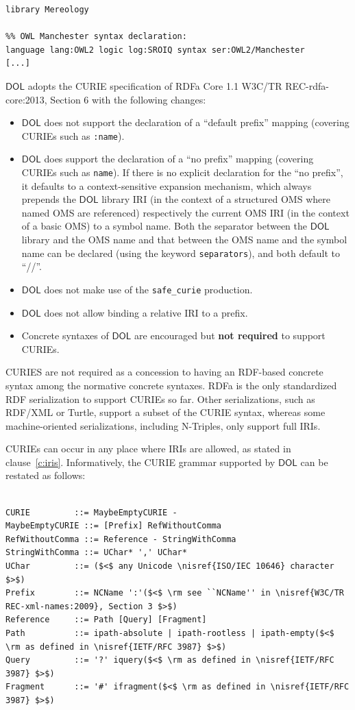 \documentclass[10pt,fleqn,final]{scrreprt}
\makeatletter
\newcommand*\CommentAuthor{}
\renewcommand*\CommentAuthor{#1}}
\newcommand*\CommentDate{}
\renewcommand*\CommentDate{#1}}
\newcommand*\CommentId{}
\renewcommand*\CommentId{#1}}
\newcommand*\CommentType{}
\renewcommand*\CommentType{#1}}
\newcommand*{\SetCommentColorByType}[1]{%
\edef\localType{{#1}}%
\expandafter\ifstrequal\localType{q-aut}{\colorlet{CommentColor}{red}}{%
\expandafter\ifstrequal\localType{q-all}{\colorlet{CommentColor}{orange}}{%
\expandafter\ifstrequal\localType{todo}{\colorlet{CommentColor}{orange}}{%
\expandafter\ifstrequal\localType{fyi}{\colorlet{CommentColor}{lightgray}}{%
\colorlet{CommentColor}{yellow}}}}}}
\newcommand*{\SetCommentPrefixByType}[1]{%
\edef\localType{{#1}}%
\expandafter\@ifmtarg\localType{%
\edef\CommentPrefix{}%
}{%
\caseupper[q]{#1}%
\edef\CommentPrefix{\thestring: }%
}}
\newcommand*{\initComment}[1]{%
\setkeys{Comment}{#1}%
\SetCommentColorByType{\CommentType}%
\relax%
\SetCommentPrefixByType{\CommentType}%
\relax%
}
\newcommand*{\todonote}[2][]{%
\initComment{#1}%
\pdfcomment[author=\CommentAuthor,color=CommentColor,date=\CommentDate,id=\CommentId]{%
\CommentPrefix
#2}}
\renewcommand*{\todonote}[2][]{%
\initComment{#1}%
\ednote{\CommentPrefix #2}}
\newcommand*{\CLnote}[2][author=Christoph Lange]{%
\todonote[author=Christoph Lange,#1]{#2} 
}
\newcommand*{\syntax}[1]{\texttt{#1}}
\newcommand*{\notrequired}{\textbf{not required}\xspace}
\newcommand*{\DOL}{\ensuremath{\mathsf{DOL}}\xspace}
\newcommand{\clauserefname}{clause}
\newcommand{\cref}[1]{\clauserefname~\ref{#1}}
\newcommand{\nisref}[1]{#1}
\newenvironment{definitions}[0]{\medskip }{}
\makeatother
\begin{document}
\begin{definitions}
\begin{lstlisting}
library Mereology

%% OWL Manchester syntax declaration: 
language lang:OWL2 logic log:SROIQ syntax ser:OWL2/Manchester
[...]
\end{lstlisting}


\DOL adopts the CURIE specification of RDFa Core 1.1 \nisref{W3C/TR REC-rdfa-core:2013, Section 6} with the following changes:
\begin{itemize}
\item \DOL does not support the declaration of a ``default prefix'' mapping %
(covering CURIEs such as \syntax{:name}).
\item \DOL does support the declaration  of a ``no prefix'' mapping (covering CURIEs such as 
\syntax{name}). If there is no explicit declaration for the ``no prefix'', it defaults to a 
context-sensitive expansion mechanism, which always prepends the \DOL library IRI (in the context of a 
structured OMS where named OMS are referenced) respectively the current OMS IRI (in the context of a basic
OMS) to a symbol name. Both the separator between the \DOL library and the OMS name and that between the 
OMS name and the symbol name can be declared (using the keyword \syntax{separators}), and both default to ``//''.

\item \DOL does not make use of the \syntax{safe\_curie} production.
\item \DOL does not allow binding a relative IRI to a prefix.
\item Concrete syntaxes of \DOL are encouraged but \notrequired to support CURIEs.
\end{itemize}

{CURIES are not required as 
a concession to having an RDF-based concrete syntax among the normative concrete syntaxes.  RDFa is 
the only standardized RDF serialization to support CURIEs so far.  Other serializations, such as 
RDF/XML or Turtle, support a subset of the CURIE syntax, whereas some machine-oriented 
serializations, including N-Triples, only support full IRIs.}

CURIEs can occur in any place where IRIs are allowed, as stated in \cref{c:iris}.  Informatively, 
the CURIE grammar supported by \DOL can be restated as follows:
\begin{lstlisting}[language=ebnf,escapeinside={()}]

CURIE         ::= MaybeEmptyCURIE -
MaybeEmptyCURIE ::= [Prefix] RefWithoutComma
RefWithoutComma ::= Reference - StringWithComma
StringWithComma ::= UChar* ',' UChar*
UChar         ::= ($<$ any Unicode \nisref{ISO/IEC 10646} character $>$) 
Prefix        ::= NCName ':'($<$ \rm see ``NCName'' in \nisref{W3C/TR REC-xml-names:2009}, Section 3 $>$)
Reference     ::= Path [Query] [Fragment]
Path          ::= ipath-absolute | ipath-rootless | ipath-empty($<$ \rm as defined in \nisref{IETF/RFC 3987} $>$)
Query         ::= '?' iquery($<$ \rm as defined in \nisref{IETF/RFC 3987} $>$)
Fragment      ::= '#' ifragment($<$ \rm as defined in \nisref{IETF/RFC 3987} $>$)
\end{lstlisting}


\end{definitions}
\end{document}
